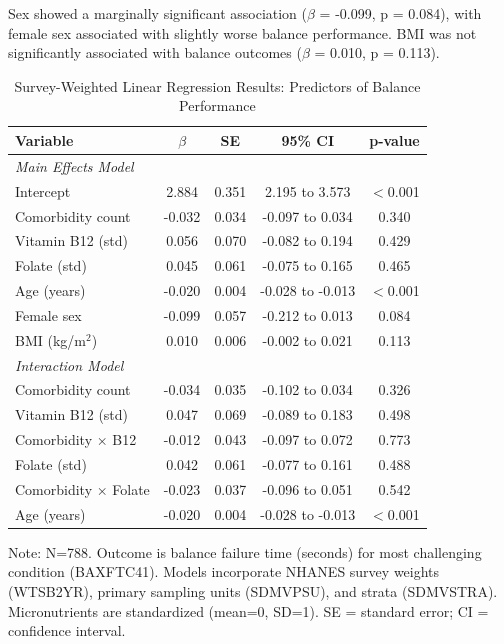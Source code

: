 \documentclass[11pt,a4paper]{article}
\begin{document}
Sex showed a marginally significant association ($\beta$ = -0.099, p = 0.084), with female sex associated with slightly worse balance performance. BMI was not significantly associated with balance outcomes ($\beta$ = 0.010, p = 0.113).

\begin{table}[htbp]
\centering
\caption{Survey-Weighted Linear Regression Results: Predictors of Balance Performance}
\label{tab:regression}
\begin{tabular}{lcccc}
\toprule
\textbf{Variable} & \textbf{$\beta$} & \textbf{SE} & \textbf{95\% CI} & \textbf{p-value} \\
\midrule
\multicolumn{5}{l}{\textit{Main Effects Model}} \\
Intercept & 2.884 & 0.351 & 2.195 to 3.573 & $<$0.001 \\
Comorbidity count & -0.032 & 0.034 & -0.097 to 0.034 & 0.340 \\
Vitamin B12 (std) & 0.056 & 0.070 & -0.082 to 0.194 & 0.429 \\
Folate (std) & 0.045 & 0.061 & -0.075 to 0.165 & 0.465 \\
Age (years) & -0.020 & 0.004 & -0.028 to -0.013 & $<$0.001 \\
Female sex & -0.099 & 0.057 & -0.212 to 0.013 & 0.084 \\
BMI (kg/m$^2$) & 0.010 & 0.006 & -0.002 to 0.021 & 0.113 \\
\midrule
\multicolumn{5}{l}{\textit{Interaction Model}} \\
Comorbidity count & -0.034 & 0.035 & -0.102 to 0.034 & 0.326 \\
Vitamin B12 (std) & 0.047 & 0.069 & -0.089 to 0.183 & 0.498 \\
Comorbidity × B12 & -0.012 & 0.043 & -0.097 to 0.072 & 0.773 \\
Folate (std) & 0.042 & 0.061 & -0.077 to 0.161 & 0.488 \\
Comorbidity × Folate & -0.023 & 0.037 & -0.096 to 0.051 & 0.542 \\
Age (years) & -0.020 & 0.004 & -0.028 to -0.013 & $<$0.001 \\
\bottomrule
\end{tabular}
\begin{flushleft}
\footnotesize{Note: N=788. Outcome is balance failure time (seconds) for most challenging condition (BAXFTC41). Models incorporate NHANES survey weights (WTSB2YR), primary sampling units (SDMVPSU), and strata (SDMVSTRA). Micronutrients are standardized (mean=0, SD=1). SE = standard error; CI = confidence interval.}
\end{flushleft}
\end{table}
\end{document}

